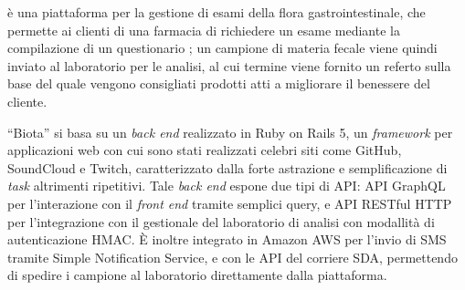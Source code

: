 
 è una piattaforma per la gestione di esami della flora gastrointestinale, che permette ai clienti di una farmacia di richiedere un esame mediante la compilazione di un questionario ; un campione di materia fecale viene quindi inviato al laboratorio per le analisi, al cui termine viene fornito un referto sulla base del quale vengono consigliati prodotti atti a migliorare il benessere del cliente.

``Biota'' si basa su un \textit{back end} realizzato in Ruby on Rails 5, un \textit{framework} per applicazioni web con cui sono stati realizzati celebri siti come GitHub, SoundCloud e Twitch, caratterizzato dalla forte astrazione e semplificazione di \textit{task} altrimenti ripetitivi.
Tale \textit{back end} espone due tipi di API: API GraphQL per l'interazione con il \textit{front end} tramite semplici query, e API RESTful HTTP per l'integrazione con il gestionale del laboratorio di analisi con modallità di autenticazione HMAC.
È inoltre integrato in Amazon AWS per l'invio di SMS tramite Simple Notification Service, e con le API del corriere SDA, permettendo di spedire i campione al laboratorio direttamente dalla piattaforma.